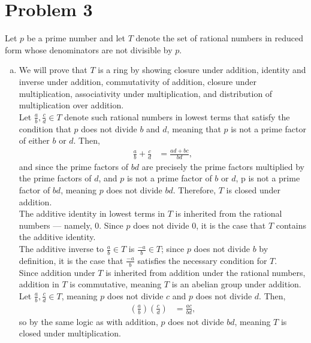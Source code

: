 \documentclass[10pt]{extarticle}
\begin{document}
  \section{Problem 3}%
  Let $p$ be a prime number and let $T$ denote the set of rational numbers in reduced form whose denominators are not divisible by $p$.
  \begin{enumerate}[(a)]
    \item We will prove that $T$ is a ring by showing closure under addition, identity and inverse under addition, commutativity of addition, closure under multiplication, associativity under multiplication, and distribution of multiplication over addition.\\

      Let $\frac{a}{b},\frac{c}{d}\in T$ denote such rational numbers in lowest terms that satisfy the condition that $p$ does not divide $b$ and $d$, meaning that $p$ is not a prime factor of either $b$ or $d$. Then,
      \begin{align*}
        \frac{a}{b} + \frac{c}{d} &= \frac{ad + bc}{bd},
      \end{align*}
      and since the prime factors of $bd$ are precisely the prime factors multiplied by the prime factors of $d$, and $p$ is not a prime factor of $b$ or $d$, p is not a prime factor of $bd$, meaning $p$ does not divide $bd$. Therefore, $T$ is closed under addition.\\

      The additive identity in lowest terms in $T$ is inherited from the rational numbers --- namely, $0$. Since $p$ does not divide $0$, it is the case that $T$ contains the additive identity.\\

      The additive inverse to $\frac{a}{b}\in T$ is $\frac{-a}{b}\in T$; since $p$ does not divide $b$ by definition, it is the case that $\frac{-a}{b}$ satisfies the necessary condition for $T$.\\

      Since addition under $T$ is inherited from addition under the rational numbers, addition in $T$ is commutative, meaning $T$ is an abelian group under addition.\\

      Let $\frac{a}{b},\frac{c}{d}\in T$, meaning $p$ does not divide $c$ and $p$ does not divide $d$. Then,
      \begin{align*}
        \left(\frac{a}{b}\right)\left(\frac{c}{d}\right) &= \frac{ac}{bd},
      \end{align*}
      so by the same logic as with addition, $p$ does not divide $bd$, meaning $T$ is closed under multiplication.\\


\end{enumerate}
\end{document}
